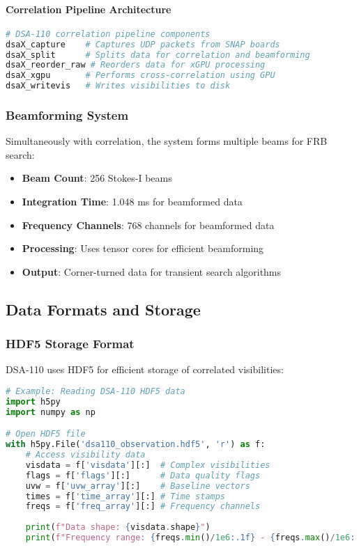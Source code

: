 \documentclass[11pt]{article}
\begin{document}
\paragraph{Correlation Pipeline Architecture}
\begin{lstlisting}[language=bash]
# DSA-110 correlation pipeline components
dsaX_capture    # Captures UDP packets from SNAP boards
dsaX_split      # Splits data for correlation and beamforming
dsaX_reorder_raw # Reorders data for xGPU processing
dsaX_xgpu       # Performs cross-correlation using GPU
dsaX_writevis   # Writes visibilities to disk
\end{lstlisting}

\subsubsection{Beamforming System}
Simultaneously with correlation, the system forms multiple beams for FRB search:

\begin{itemize}
    \item \textbf{Beam Count}: 256 Stokes-I beams
    \item \textbf{Integration Time}: 1.048 ms for beamformed data
    \item \textbf{Frequency Channels}: 768 channels for beamformed data
    \item \textbf{Processing}: Uses tensor cores for efficient beamforming
    \item \textbf{Output}: Corner-turned data for transient search algorithms
\end{itemize}

\subsection{Data Formats and Storage}

\subsubsection{HDF5 Storage Format}
DSA-110 uses HDF5 for efficient storage of correlated visibilities:

\begin{lstlisting}[language=Python]
# Example: Reading DSA-110 HDF5 data
import h5py
import numpy as np

# Open HDF5 file
with h5py.File('dsa110_observation.hdf5', 'r') as f:
    # Access visibility data
    visdata = f['visdata'][:]  # Complex visibilities
    flags = f['flags'][:]      # Data quality flags
    uvw = f['uvw_array'][:]    # Baseline vectors
    times = f['time_array'][:] # Time stamps
    freqs = f['freq_array'][:] # Frequency channels
    
    print(f"Data shape: {visdata.shape}")
    print(f"Frequency range: {freqs.min()/1e6:.1f} - {freqs.max()/1e6:.1f} MHz")
\end{lstlisting}
\end{document}
